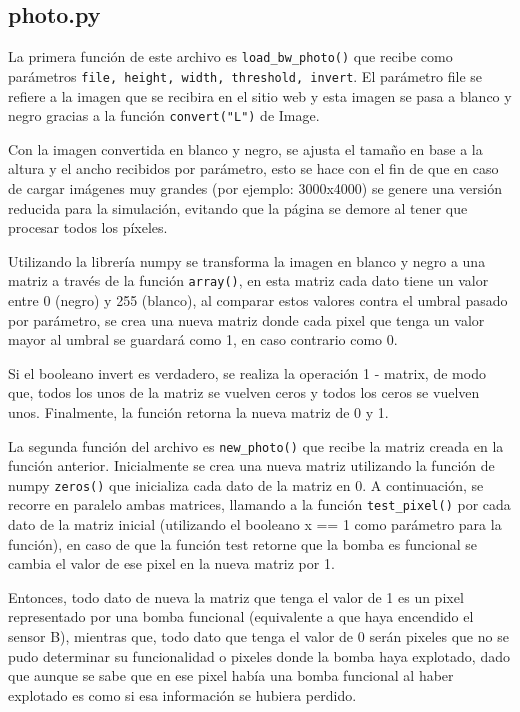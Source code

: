 \documentclass[conference]{IEEEtran}
\begin{document}
\subsection{photo.py}
La primera función de este archivo es \texttt{load\_bw\_photo()} que recibe como parámetros \texttt{file, height, width, threshold, invert}. El parámetro
file se refiere a la imagen que se recibira en el sitio web y esta imagen se pasa a blanco y negro gracias a la función \texttt{convert("L")} de Image.

Con la imagen convertida en blanco y negro, se ajusta el tamaño en base a la altura y el ancho recibidos por parámetro, esto se hace con el fin de que
en caso de cargar imágenes muy grandes (por ejemplo: 3000x4000) se genere una versión reducida para la simulación, evitando que la página se demore al tener 
que procesar todos los píxeles.

Utilizando la librería numpy se transforma la imagen en blanco y negro a una matriz a través de la función \texttt{array()}, en esta matriz cada dato tiene un
valor entre 0 (negro) y 255 (blanco), al comparar estos valores contra el umbral pasado por parámetro, se crea una nueva matriz donde cada pixel que tenga un valor
mayor al umbral se guardará como 1, en caso contrario como 0.

Si el booleano invert es verdadero, se realiza la operación 1 - matrix, de modo que, todos los unos de la matriz se vuelven ceros y todos los ceros
se vuelven unos. Finalmente, la función retorna la nueva matriz de 0 y 1.

La segunda función del archivo es \texttt{new\_photo()} que recibe la matriz creada en la función anterior. Inicialmente se crea una nueva matriz utilizando la función de
numpy \texttt{zeros()} que inicializa cada dato de la matriz en 0. A continuación, se recorre en paralelo ambas matrices, llamando a la función \texttt{test\_pixel()} por cada dato
de la matriz inicial (utilizando el booleano x == 1 como parámetro para la función), en caso de que la función test retorne que la bomba es funcional se cambia el valor
de ese pixel en la nueva matriz por 1.

Entonces, todo dato de nueva la matriz que tenga el valor de 1 es un pixel representado por una bomba funcional (equivalente a que haya encendido el sensor B), mientras que,
todo dato que tenga el valor de 0 serán pixeles que no se pudo determinar su funcionalidad o pixeles donde la bomba haya explotado, dado que aunque se sabe que en ese pixel
había una bomba funcional al haber explotado es como si esa información se hubiera perdido. 
\end{document}
